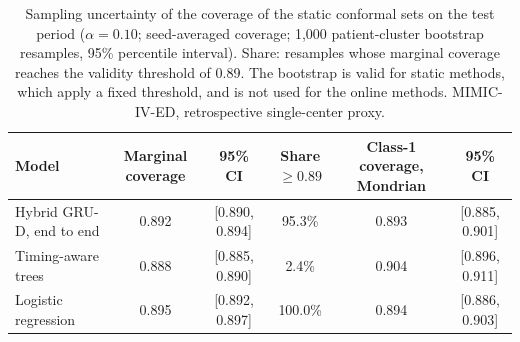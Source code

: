 \begin{table}[t]
\centering
\caption{Sampling uncertainty of the coverage of the static conformal sets on the test period ($\alpha = 0.10$; seed-averaged coverage; 1,000 patient-cluster bootstrap resamples, 95\% percentile interval). Share: resamples whose marginal coverage reaches the validity threshold of 0.89. The bootstrap is valid for static methods, which apply a fixed threshold, and is not used for the online methods. MIMIC-IV-ED, retrospective single-center proxy.}
\label{tab:static-cov}
\begin{tabular}{lccccc}
\toprule
Model & Marginal coverage & 95\% CI & Share $\geq 0.89$ & Class-1 coverage, Mondrian & 95\% CI \\
\midrule
Hybrid GRU-D, end to end & 0.892 & [0.890, 0.894] & 95.3\% & 0.893 & [0.885, 0.901] \\
Timing-aware trees & 0.888 & [0.885, 0.890] & 2.4\% & 0.904 & [0.896, 0.911] \\
Logistic regression & 0.895 & [0.892, 0.897] & 100.0\% & 0.894 & [0.886, 0.903] \\
\bottomrule
\end{tabular}
\end{table}

